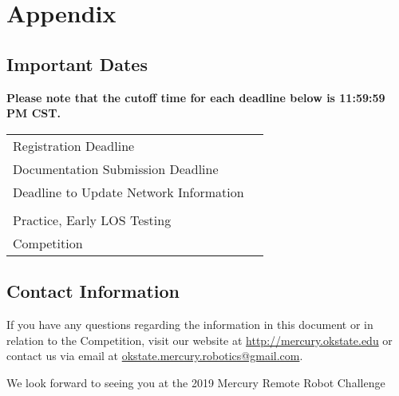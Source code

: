 \section{Appendix}
\subsection{Important Dates}
\textbf{Please note that the cutoff time for each deadline below is 11:59:59 PM CST.} \\

\begin{tabular}{ll}
Registration Deadline					&	\registration		\\
Documentation Submission Deadline		&	\documentation	\\
Deadline to Update Network Information	&	\network			\\
									&	\\
Practice, Early LOS Testing				&	\los 			\\
Competition							&	\competition 		\\

\end{tabular}

\subsection{Contact Information}
If you have any questions regarding the information in this document or in relation to the Competition, visit our website at \url{http://mercury.okstate.edu} or contact us via email at \href{mailto:okstate.mercury.robotics@gmail.com}{ okstate.mercury.robotics@gmail.com}.

\vfill
\begin{center}
{\huge We look forward to seeing you at the 2019 Mercury Remote Robot Challenge}
\end{center}